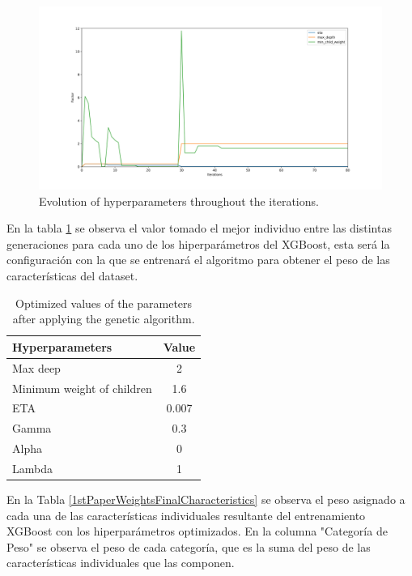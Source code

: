 \documentclass{uathesis-es}
\begin{document}
 \begin{figure}[H]
	     \centering
	     \includegraphics[width=14cm]{Figures/1stPaper/EvolutionH.png}
	     \caption{Evolution of hyperparameters throughout the iterations.}
	     \label{EvolucionHiperparametrosImage}
 \end{figure}


En la tabla \ref{BestGASolutionTable} se observa el valor tomado el mejor individuo entre las distintas generaciones para cada uno de los hiperparámetros del XGBoost, esta será la configuración con la que se entrenará el algoritmo para obtener el peso de las características del dataset.

\begin{table}[h]
	\centering
	\begin{tabular}{ |l|c| } 
		\hline
		\textbf{Hyperparameters} & \textbf{Value}\\
		\hline
		Max deep & 2 \\
		Minimum weight of children & 1.6 \\ 
		ETA & 0.007 \\
		Gamma & 0.3 \\
		Alpha & 0 \\
		Lambda & 1 \\
		\hline
	\end{tabular}
	\caption{Optimized values of the parameters after applying the genetic algorithm.}
	\label{BestGASolutionTable}
\end{table}


En la Tabla \ref{1stPaperWeightsFinalCharacteristics} se observa el peso asignado a cada una de las características individuales resultante del entrenamiento XGBoost con los hiperparámetros optimizados. En la columna "Categoría de Peso" se observa el peso de cada categoría, que es la suma del peso de las características individuales que las componen.
\end{document}
